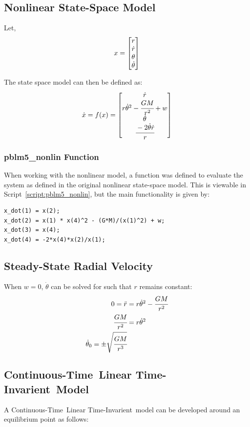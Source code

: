 \documentclass[]{article}
\renewcommand{\lstlistingname}{Script}
\newcommand{\scriptname}{\lstlistingname}
\newcommand{\CT}{Continuous-Time}
\newcommand{\LTI}{Linear Time-Invarient}
\begin{document}
	\subsection{Nonlinear State-Space Model}
		Let,
		\begin{equation}
			x = \mqty[r\\ \dot{r}\\ \theta\\ \dot{\theta}]
		\end{equation}
		
		The state space model can then be defined as:
		\begin{equation}
			\dot{x} = f(x) = \mqty[\dot{r}\\
									r \dot{\theta}^2 - \cfrac{G M}{r^2} + w\\
									\dot{\theta}\\
									\cfrac{-2\dot{\theta}\dot{r}}{r}]
		\end{equation}
		
		\subsubsection{pblm5\_nonlin Function}
			When working with the nonlinear model, a function was defined to evaluate the system as defined in the original nonlinear state-space model. This is viewable in \scriptname \ \ref{script:pblm5_nonlin}, but the main functionality is given by:
\begin{lstlisting}
x_dot(1) = x(2);
x_dot(2) = x(1) * x(4)^2 - (G*M)/(x(1)^2) + w;
x_dot(3) = x(4);
x_dot(4) = -2*x(4)*x(2)/x(1);
\end{lstlisting}
			
	\subsection{Steady-State Radial Velocity}
		When $w = 0$, $\dot{\theta}$ can be solved for such that $r$ remains constant:
		\begin{align}
			0 = \ddot{r} &= r \dot{\theta}^2 - \cfrac{G M}{r^2}\\
			\cfrac{G M}{r^2} &= r \dot{\theta}^2\\
			\dot{\theta}_0 = \pm \sqrt{\cfrac{G M}{r^3}}
		\end{align}
	
	\subsection{\CT \ \LTI \ Model}
		A \CT \ \LTI \ model can be developed around an equilibrium point as follows:\\
		
\end{document}

